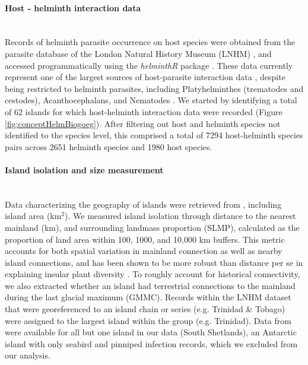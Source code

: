 \paragraph*{Host - helminth interaction data}\mbox{}\\ 
Records of helminth parasite occurrence on host species were obtained from the parasite database of the London Natural History Museum (LNHM) \parencite{gibson2005}, and accessed programmatically using the \textit{helminthR} package \parencite{helminthr}. These data currently represent one of the largest sources of host-parasite interaction data \parencite{dallas2018}, despite being restricted to helminth parasites, including Platyhelminthes (trematodes and cestodes), Acanthocephalans, and Nematodes \parencite{gibson2005}. We started by identifying a total of 62 islands for which host-helminth interaction data were recorded (Figure \ref{fig:conceptHelmBiogoeg}). After filtering out host and helminth species not identified to the species level, this comprised a total of 7294 host-helminth species pairs across 2651 helminth species and 1980 host species.

\paragraph*{Island isolation and size measurement}\mbox{}\\ 
Data characterizing the geography of islands were retrieved from \parencite{Weigelt2013}, including island area (km$^2$). We measured island isolation through distance to the nearest mainland (km), and surrounding landmass proportion (SLMP), calculated as the proportion of land area within 100, 1000, and 10,000 km buffers. This metric accounts for both spatial variation in mainland connection as well as nearby island connections, and has been shown to be more robust than distance per se in explaining insular plant diversity \parencite{weigelt2013quantifying}. To roughly account for historical connectivity, we also extracted whether an island had terrestrial connections to the mainland during the last glacial maximum (GMMC). Records within the LNHM dataset that were georeferenced to an island chain or series (e.g. Trinidad \& Tobago) were assigned to the largest island within the group (e.g. Trinidad). Data from \parencite{Weigelt2013} were available for all but one island in our data (South Shetlands), an Antarctic island with only seabird and pinniped infection records, which we excluded from our analysis. 



